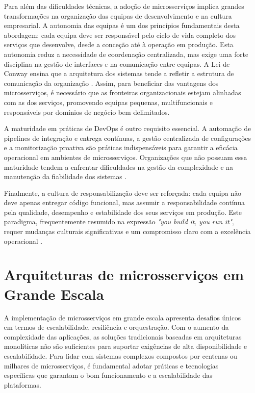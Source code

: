 Para além das dificuldades técnicas, a adoção de microsserviços implica grandes transformações na organização das equipas de desenvolvimento e na cultura empresarial. A autonomia das equipas é um dos princípios fundamentais desta abordagem: cada equipa deve ser responsável pelo ciclo de vida completo dos serviços que desenvolve, desde a conceção até à operação em produção. Esta autonomia reduz a necessidade de coordenação centralizada, mas exige uma forte disciplina na gestão de interfaces e na comunicação entre equipas. A Lei de Conway ensina que a arquitetura dos sistemas tende a refletir a estrutura de comunicação da organização \cite{Bailey2013}. Assim, para beneficiar das vantagens dos microsserviços, é necessário que as fronteiras organizacionais estejam alinhadas com as dos serviços, promovendo equipas pequenas, multifuncionais e responsáveis por domínios de negócio bem delimitados.

A maturidade em práticas de DevOps é outro requisito essencial. A automação de pipelines de integração e entrega contínuas, a gestão centralizada de configurações e a monitorização proativa são práticas indispensáveis para garantir a eficácia operacional em ambientes de microsserviços. Organizações que não possuam essa maturidade tendem a enfrentar dificuldades na gestão da complexidade e na manutenção da fiabilidade dos sistemas \cite{Lewis2014}.

Finalmente, a cultura de responsabilização deve ser reforçada: cada equipa não deve apenas entregar código funcional, mas assumir a responsabilidade contínua pela qualidade, desempenho e estabilidade dos seus serviços em produção. Este paradigma, frequentemente resumido na expressão \textit{"you build it, you run it"}, requer mudanças culturais significativas e um compromisso claro com a excelência operacional \cite{Khan2022}.


\section{Arquiteturas de microsserviços em Grande Escala}

A implementação de microsserviços em grande escala apresenta desafios únicos em termos de escalabilidade, resiliência e orquestração. Com o aumento da complexidade das aplicações, as soluções tradicionais baseadas em arquiteturas monolíticas não são suficientes para suportar exigências de alta disponibilidade e escalabilidade. Para lidar com sistemas complexos compostos por centenas ou milhares de microsserviços, é fundamental adotar práticas e tecnologias específicas que garantam o bom funcionamento e a escalabilidade das plataformas.

